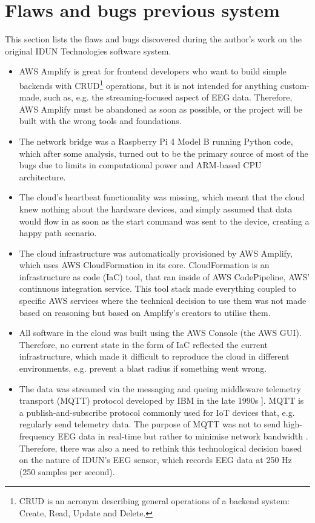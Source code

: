 \chapter{Flaws and bugs previous system}
\label{appendix2-flaws-and-bugs-previous-system}

This section lists the flaws and bugs discovered during the author's work on the original IDUN Technologies software system.

\begin{itemize}
  \item AWS Amplify is great for frontend developers who want to build simple backends with CRUD\footnote{CRUD is an acronym describing general operations of a backend system: Create, Read, Update and Delete.} operations, but it is not intended for anything custom-made, such as, e.g. the streaming-focused aspect of EEG data. Therefore, AWS Amplify must be abandoned as soon as possible, or the project will be built with the wrong tools and foundations.
  \item The network bridge was a Raspberry Pi 4 Model B running Python code, which after some analysis, turned out to be the primary source of most of the bugs due to limits in computational power and ARM-based CPU architecture.
  \item The cloud's heartbeat functionality was missing, which meant that the cloud knew nothing about the hardware devices, and simply assumed that data would flow in as soon as the start command was sent to the device, creating a happy path scenario.
  \item The cloud infrastructure was automatically provisioned by AWS Amplify, which uses AWS CloudFormation in its core. CloudFormation is an infrastructure as code (IaC) tool, that ran inside of AWS CodePipeline, AWS' continuous integration service. This tool stack made everything coupled to specific AWS services where the technical decision to use them was not made based on reasoning but based on Amplify's creators to utilise them.
  \item All software in the cloud was built using the AWS Console (the AWS GUI). Therefore, no current state in the form of IaC reflected the current infrastructure, which made it difficult to reproduce the cloud in different environments, e.g. prevent a blast radius if something went wrong.
  \item The data was streamed via the messaging and queing middleware telemetry transport (MQTT) protocol developed by IBM in the late 1990s ]\citep{yuan_getting_2017}. MQTT is a publish-and-subscribe protocol commonly used for IoT devices that, e.g. regularly send telemetry data. The purpose of MQTT was not to send high-frequency EEG data in real-time but rather to minimise network bandwidth \citep{mqtt_use_nodate}. Therefore, there was also a need to rethink this technological decision based on the nature of IDUN's EEG sensor, which records EEG data at 250 Hz (250 samples per second).

\end{itemize}

